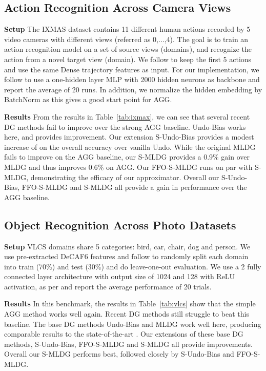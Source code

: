 \documentclass[runningheads]{llncs}
\newcommand{\nameS}{S-MLDG}
\newcommand{\nameFFS}{FFO-\nameS}
\newcommand{\hundo}{S-Undo-Bias}
\newcommand{\keypoint}[1]{\vspace{0.1cm}\noindent\textbf{#1}\quad}
\begin{document}
\subsection{Action Recognition Across Camera Views}
\keypoint{Setup}
The IXMAS dataset contains 11 different human actions recorded by 5 video cameras with different views (referred as 0,...,4). The goal is to train an action recognition model on a set of source views (domains), and recognize the action from a novel target view (domain).
We follow \cite{mmdaaecvpr2018} to keep the first 5 actions and use the same Dense trajectory features as input. For our implementation, we follow \cite{mmdaaecvpr2018} to use a one-hidden layer MLP with 2000 hidden neurons as backbone and report the average of 20 runs. In addition, we normalize the hidden embedding by BatchNorm \cite{pmlr-v37-ioffe15} as this gives a good start point for AGG.

\keypoint{Results}
From the results in Table~\ref{tab:ixmax}, we can see that several recent DG methods \cite{Li2018MLDG,shiv2018dg,NIPS2018_metareg,mmdaaecvpr2018} fail to improve over the strong AGG baseline. Undo-Bias works here, and provides  improvement. Our extension \hundo{} provides a modest increase of  on the overall accuracy over vanilla Undo. While the original MLDG \cite{Li2018MLDG} fails to improve on the AGG baseline, our \nameS{} provides a 0.9\% gain over MLDG and thus improves 0.6\% on AGG. Our \nameFFS{} runs on par with \nameS{}, demonstrating the efficacy of our approximator. Overall our \hundo{}, \nameFFS{} and \nameS{} all provide a gain in performance over the AGG baseline.



\subsection{Object Recognition Across Photo Datasets}
\keypoint{Setup} VLCS domains share 5 categories: bird, car, chair, dog and person. We use  pre-extracted DeCAF6 features and follow \cite{motiian2017CCSA} to randomly split each domain into train (70\%) and test (30\%) and do leave-one-out evaluation. We use a 2 fully connected layer architecture with output size of 1024 and 128 with ReLU activation, as per \cite{motiian2017CCSA} and report the average performance of 20 trials. 


\keypoint{Results}
In this benchmark, the results in Table~\ref{tab:vlcs} show that the simple AGG method works well again. Recent DG methods \cite{shiv2018dg,NIPS2018_metareg} still struggle to beat this baseline. The base DG methods Undo-Bias \cite{ECCV12_Khosla} and MLDG \cite{Li2018MLDG} work well here, producing comparable results to the state-of-the-art \cite{mmdaaecvpr2018}. Our extensions of these base DG methods, \hundo{}, \nameFFS{} and \nameS{} all provide improvements. Overall our \nameS{} performs best, followed closely by \hundo{} and \nameFFS{}.
\end{document}
